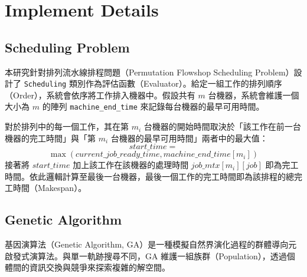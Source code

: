 \documentclass[conference]{IEEEtran}
\begin{document}
\section{Implement Details}

\subsection{Scheduling Problem}
本研究針對排列流水線排程問題（Permutation Flowshop Scheduling Problem）設計了 \texttt{Scheduling} 類別作為評估函數（Evaluator）。給定一組工作的排列順序（Order），系統會依序將工作排入機器中。假設共有 $m$ 台機器，系統會維護一個大小為 $m$ 的陣列 \texttt{machine\_end\_time} 來記錄每台機器的最早可用時間。

對於排列中的每一個工作，其在第 $m_i$ 台機器的開始時間取決於「該工作在前一台機器的完工時間」與「第 $m_i$ 台機器的最早可用時間」兩者中的最大值：
$$start\_time =$$
$$ \max(current\_job\_ready\_time, machine\_end\_time[m_i])$$
接著將 $start\_time$ 加上該工作在該機器的處理時間 $job\_mtx[m_i][job]$ 即為完工時間。依此邏輯計算至最後一台機器，最後一個工作的完工時間即為該排程的總完工時間（Makespan）。

\subsection{Genetic Algorithm}

基因演算法（Genetic Algorithm, GA）是一種模擬自然界演化過程的群體導向元啟發式演算法。與單一軌跡搜尋不同，GA 維護一組族群（Population），透過個體間的資訊交換與競爭來探索複雜的解空間。
\end{document}
